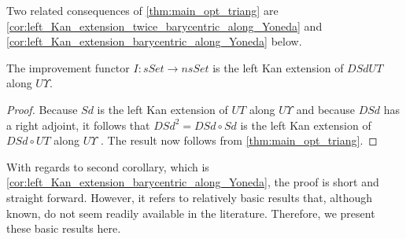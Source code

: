 Two related consequences of \cref{thm:main_opt_triang} are \cref{cor:left_Kan_extension_twice_barycentric_along_Yoneda} and \cref{cor:left_Kan_extension_barycentric_along_Yoneda} below.
\begin{corollary}\label{cor:left_Kan_extension_twice_barycentric_along_Yoneda}
The improvement functor $I:sSet\to nsSet$ is the left Kan extension of $DSdUT$ along $U\Upsilon$.
\end{corollary}
\begin{proof}
Because $Sd$ is the left Kan extension of $UT$ along $U\Upsilon$ and because $DSd$ has a right adjoint, it follows that $DSd^2=DSd\circ Sd$ is the left Kan extension of $DSd\circ UT$ along $U\Upsilon$ \cite[X.5~Thm.~1]{ML98}. The result now follows from \cref{thm:main_opt_triang}.
\end{proof}
\noindent With regards to second corollary, which is \cref{cor:left_Kan_extension_barycentric_along_Yoneda}, the proof is short and straight forward. However, it refers to relatively basic results that, although known, do not seem readily available in the literature. Therefore, we present these basic results here.

